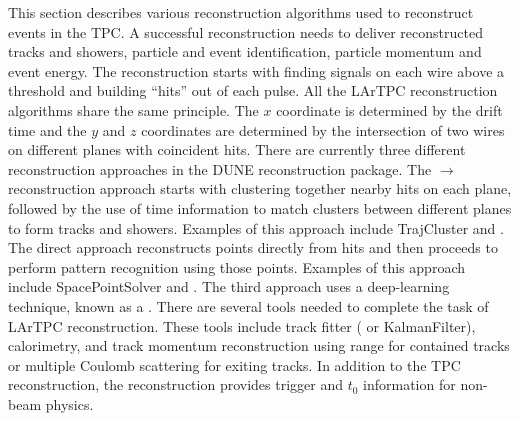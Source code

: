 This section describes various reconstruction algorithms used to reconstruct events in the  TPC. A successful \lartpc reconstruction needs to deliver reconstructed tracks and showers, particle and event identification, particle momentum and event energy. The reconstruction starts with finding signals on each wire above a threshold and building ``hits'' out of each pulse. All the LArTPC \threed reconstruction algorithms share the same principle. The $x$ coordinate is determined by the drift time and the $y$ and $z$ coordinates are determined by the intersection of two wires on different planes with coincident hits. There are currently three different reconstruction approaches in the DUNE reconstruction package. The \twod$\rightarrow$\threed reconstruction approach starts with clustering together nearby hits on each plane, %
followed by the use of time information to match \twod clusters between different planes to form \threed tracks and showers. Examples of this approach include TrajCluster and .  The direct \threed approach reconstructs \threed points directly from hits and then proceeds to perform pattern recognition using those \threed points. Examples of this approach include SpacePointSolver and . The third approach uses a deep-learning technique, known as a . There are several tools needed to complete the task of LArTPC reconstruction. These tools include track fitter ( or KalmanFilter), calorimetry,  and track momentum reconstruction using range for contained tracks or multiple Coulomb scattering for exiting tracks. In addition to the TPC reconstruction, the  reconstruction provides trigger and $t_0$ information for non-beam physics. 

